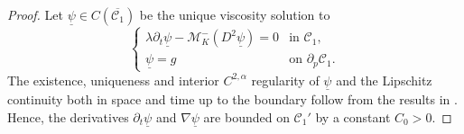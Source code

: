 \documentclass[12pt]{article}
\numberwithin{Theorem}{section}
\theoremstyle{definition}
\theoremstyle{remark}
\numberwithin{equation}{section}
\begin{document}
\begin{proof}
Let $\underline{\psi} \in C(\overline{\mathcal{C}_1})$ be the unique viscosity solution to 
\begin{equation} \label{eq:psi_under}
\begin{cases}
\lambda \partial_t \underline{\psi} - \mathcal{M}_K^-(D^2 \underline{\psi}) = 0 & \text{in } \mathcal{C}_1, \\
\underline{\psi} = g  & \text{on } \partial_p \mathcal{C}_1.
\end{cases}
\end{equation}
The existence, uniqueness and interior $C^{2,\alpha}$ regularity of $\underline{\psi}$ and the Lipschitz continuity both in space and time up to the boundary follow from the results in \cite{wang1992regularityI,wang1992regularityII,lian2026boundary}.  Hence, the derivatives $\partial_t \underline{\psi}$ and $\nabla \underline{\psi}$ are bounded on $\mathcal{C}_1'$ by a constant $C_0 > 0$. 


\end{proof}
\end{document}
